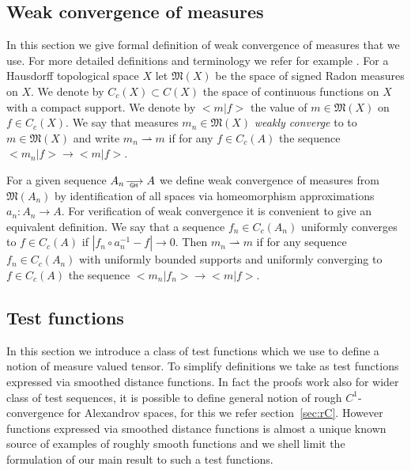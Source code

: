 \documentclass[a4paper,10pt]{article}
\begin{document}



 
 
 
\subsection{Weak convergence of measures}
In this section we give formal definition of weak convergence of measures
that we use.
For more detailed definitions and terminology we refer for example
\cite{GMS}.
For a Hausdorff topological space $X$ let
$\mathfrak M(X)$ be the space of signed Radon measures on $X$.
We denote by $C_c(X)\subset C(X)$  the space of continuous functions on $X$
with a compact support. 
We  denote by $<m|f>$ the value of
$m\in\mathfrak M(X)$
 on $f\in C_c(X)$.
 We say that measures $m_n\in \mathfrak M(X)$ 
\emph{weakly converge} to
to $m\in \mathfrak M(X)$ and write
$m_n\rightharpoonup m$
 if for
any
$f\in C_c(A)$ the sequence $<m_n|f>\to <m|f>$.

For a given  sequence $A_n\GHto A$
we define weak convergence of  measures from
$\mathfrak M(A_n)$
by identification of all spaces via homeomorphism
approximations $a_n:A_n\to A$.
For verification of weak convergence it is convenient to 
give an equivalent definition.
We say that  a sequence $f_n\in C_c(A_n)$
uniformly converges to $f\in C_c(A)$
if $| f_n   \circ a_n^{-1}-f|\to 0$.
Then  $m_n\rightharpoonup m$
if for any sequence $f_n\in C_c(A_n)$
with uniformly bounded supports and
uniformly converging to $f\in C_c(A)$
 the sequence $<m_n|f_n>\to <m|f>$.


\subsection{ Test functions}
In this section we introduce a class of test functions
which we use
to define  a notion of measure valued tensor.
To simplify definitions we take as test  functions
 expressed via smoothed distance functions.
 In fact the proofs  work 
  also for wider class of test
 sequences, it is possible to define general notion of
 rough $C^1$-convergence 
 for Alexandrov spaces, for this we refer section~\ref{sec:rC}. 
However  functions
 expressed via smoothed distance functions
 is almost a unique known source of
 examples of roughly smooth functions and
we shell limit the formulation of our main result to such a test functions.
\end{document}

